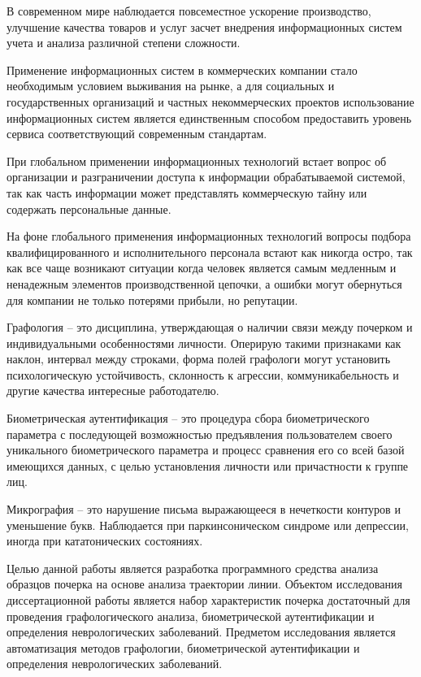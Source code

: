 \label{sec:intro}

В современном мире наблюдается повсеместное ускорение производство, улучшение качества товаров и услуг засчет внедрения информационных систем учета и анализа различной степени сложности.

Применение информационных систем в коммерческих компании стало необходимым условием выживания на рынке, а для социальных и государственных организаций и частных некоммерческих проектов использование информационных систем является единственным способом предоставить уровень сервиса соответствующий современным стандартам. 

При глобальном применении информационных технологий встает вопрос об организации и разграничении доступа к информации обрабатываемой системой, так как часть информации может представлять коммерческую тайну или содержать персональные данные.

На фоне глобального применения информационных технологий вопросы подбора квалифицированного и исполнительного персонала встают как никогда остро, так как все чаще возникают ситуации когда человек является самым медленным и ненадежным элементов производственной цепочки, а ошибки могут обернуться для компании не только потерями прибыли, но репутации.

Графология -- это дисциплина, утверждающая о наличии связи между почерком и индивидуальными особенностями личности. Оперирую такими признаками как наклон, интервал между строками, форма полей графологи могут установить психологическую устойчивость, склонность к агрессии, коммуникабельность и другие качества интересные работодателю.

Биометрическая аутентификация -- это процедура сбора биометрического параметра с последующей возможностью предъявления пользователем своего уникального биометрического параметра и процесс сравнения его со всей базой имеющихся данных, с целью установления личности или причастности к группе лиц.

Микрография -- это нарушение письма выражающееся в нечеткости контуров и уменьшение букв. Наблюдается при паркинсоническом синдроме или депрессии, иногда при кататонических состояниях.

Целью данной работы является разработка программного средства анализа образцов почерка на основе анализа траектории линии.
Объектом исследования диссертационной работы является набор характеристик почерка достаточный для проведения графологического анализа, биометрической аутентификации и определения неврологических заболеваний.
Предметом исследования является автоматизация методов графологии, биометрической аутентификации и определения неврологических заболеваний.

